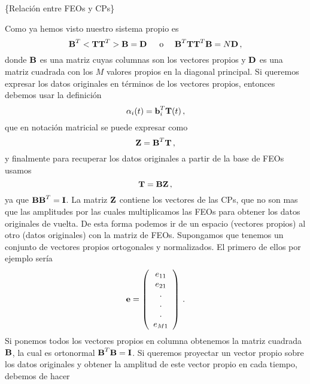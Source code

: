 \documentclass[
]{agujournal2019}
\begin{document}
\begin{center}
\end{center}

\vspace{0.25cm}

\{\textbf \noindent Relación entre FEOs y CPs\}

Como ya hemos visto nuestro sistema propio es
\[{\textbf B}^T<{\textbf T}{\textbf T}^T>{\textbf B}={\textbf D}\,\,\,\,\,\,\,\,\,{\rm o}\,\,\,\,\,\,\,\,{\textbf B}^T{\textbf T}{\textbf T}^T{\textbf B}=N{\textbf D}\,,\]
donde \({\textbf B}\) es una matriz cuyas columnas son los vectores
propios y \({\textbf D}\) es una matriz cuadrada con los \(M\) valores
propios en la diagonal principal. Si queremos expresar los datos
originales en términos de los vectores propios, entonces debemos usar la
definición \[\alpha_i(t)={\textbf b}^T_{i}{\textbf T}(t)\,,\] que en
notación matricial se puede expresar como
\[{\textbf Z}={\textbf B}^T{\textbf T}\,,\] y finalmente para recuperar
los datos originales a partir de la base de FEOs usamos
\[{\textbf T}={\textbf B}{\textbf Z}\,,\] ya que
\({\textbf B}{\textbf B}^T={\textbf I}\). La matriz \({\textbf Z}\)
contiene los vectores de las CPs, que no son mas que las amplitudes por
las cuales multiplicamos las FEOs para obtener los datos originales de
vuelta. De esta forma podemos ir de un espacio (vectores propios) al
otro (datos originales) con la matriz de FEOs. Supongamos que tenemos un
conjunto de vectores propios ortogonales y normalizados. El primero de
ellos por ejemplo sería \[{\textbf e}=\left(\begin{array}{c}
   e_{11} \\
   e_{21} \\
         .\\
         .\\
     .\\
   e_{M1} \\
        \end{array}\right)\,.\] Si ponemos todos los vectores propios en
columna obtenemos la matriz cuadrada \({\textbf B}\), la cual es
ortonormal \({\textbf B}^T{\textbf B}={\textbf I}\). Si queremos
proyectar un vector propio sobre los datos originales y obtener la
amplitud de este vector propio en cada tiempo, debemos de hacer
\end{document}
